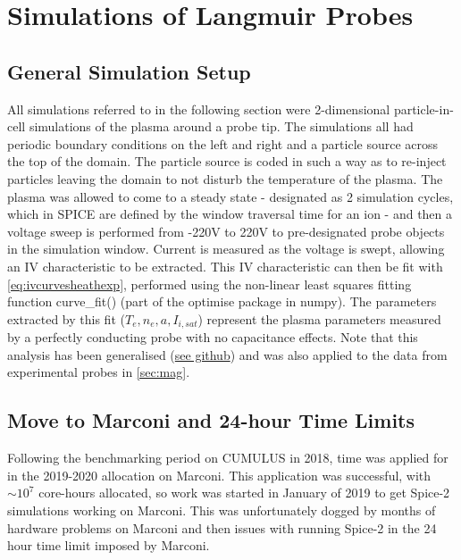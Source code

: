 \documentclass[a4paper, 12pt]{article} %
\begin{document}


\section{\label{sec:lpsims}Simulations of Langmuir Probes}

\subsection{\label{ssec:sim_setup}General Simulation Setup}
	All simulations referred to in the following section were 2-dimensional particle-in-cell simulations of the plasma around a probe tip.
	The simulations all had periodic boundary conditions on the left and right and a particle source across the top of the domain. 
	The particle source is coded in such a way as to re-inject particles leaving the domain to not disturb the temperature of the plasma.
	The plasma was allowed to come to a steady state - designated as 2 simulation cycles, which in SPICE are defined by the window traversal time for an ion - and then a voltage sweep is performed from -220V to 220V to pre-designated probe objects in the simulation window. 
	Current is measured as the voltage is swept, allowing an IV characteristic to be extracted.
	This IV characteristic can then be fit with \cref{eq:ivcurvesheathexp}, performed using the non-linear least squares fitting function curve\_fit() (part of the optimise package in numpy).
	The parameters extracted by this fit ($T_e, n_e, a, I_{i, sat}$) represent the plasma parameters measured by a perfectly conducting probe with no capacitance effects. 
	Note that this analysis has been generalised (\hyperlink{https://github.com/jackleland/flopter}{see github}) and was also applied to the data from experimental probes in \cref{sec:mag}.

\subsection{\label{ssec:marconi}Move to Marconi and 24-hour Time Limits}
    Following the benchmarking period on CUMULUS in 2018, time was applied for in the 2019-2020 allocation on Marconi. 
    This application was successful, with $\sim10^{7}$ core-hours allocated, so work was started in January of 2019 to get Spice-2 simulations working on Marconi.
    This was unfortunately dogged by months of hardware problems on Marconi and then issues with running Spice-2 in the 24 hour time limit imposed by Marconi.
    
\end{document}
